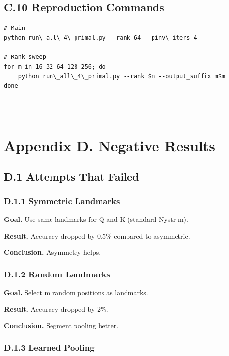 \subsection{C.10 Reproduction Commands}

\begin{lstlisting}
# Main
python run\_all\_4\_primal.py --rank 64 --pinv\_iters 4

# Rank sweep
for m in 16 32 64 128 256; do
    python run\_all\_4\_primal.py --rank $m --output_suffix m$m
done
\end{lstlisting}
\begin{lstlisting}

---
\end{lstlisting}


\section{Appendix D. Negative Results}

\subsection{D.1 Attempts That Failed}

\subsubsection{D.1.1 Symmetric Landmarks}

\textbf{Goal.} Use same landmarks for Q and K (standard Nystr m).

\textbf{Result.} Accuracy dropped by 0.5\% compared to asymmetric.

\textbf{Conclusion.} Asymmetry helps.

\subsubsection{D.1.2 Random Landmarks}

\textbf{Goal.} Select m random positions as landmarks.

\textbf{Result.} Accuracy dropped by 2\%.

\textbf{Conclusion.} Segment pooling better.

\subsubsection{D.1.3 Learned Pooling}

